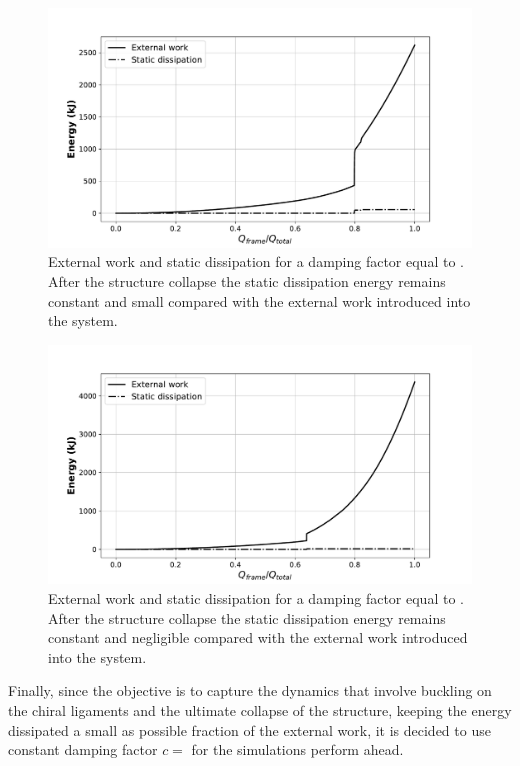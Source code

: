     \begin{figure}[!htpb]
      \centering
      \includegraphics[width=0.8 \textwidth]{../figures/result-model/energy_damp-8}
      \caption[External work and static dissipation for a damping factor equal to ]{External work and static dissipation for a damping factor equal to . After the structure collapse the static dissipation energy remains constant and small compared with the external work introduced into the system.}\label{fig:energy_damp-8}
    \end{figure}

    \begin{figure}[!htpb]
      \centering
      \includegraphics[width=0.8 \textwidth]{../figures/result-model/energy_damp-9}
      \caption[External work and static dissipation for a damping factor equal to ]{External work and static dissipation for a damping factor equal to . After the structure collapse the static dissipation energy remains constant and negligible compared with the external work introduced into the system.}\label{fig:energy_damp-9}
    \end{figure}

    Finally, since the objective is to capture the dynamics that involve buckling on the chiral ligaments and the ultimate collapse of the structure, keeping the energy dissipated a small as possible fraction of the external work, it is decided to use constant damping factor $c =$ for the simulations perform ahead. 

